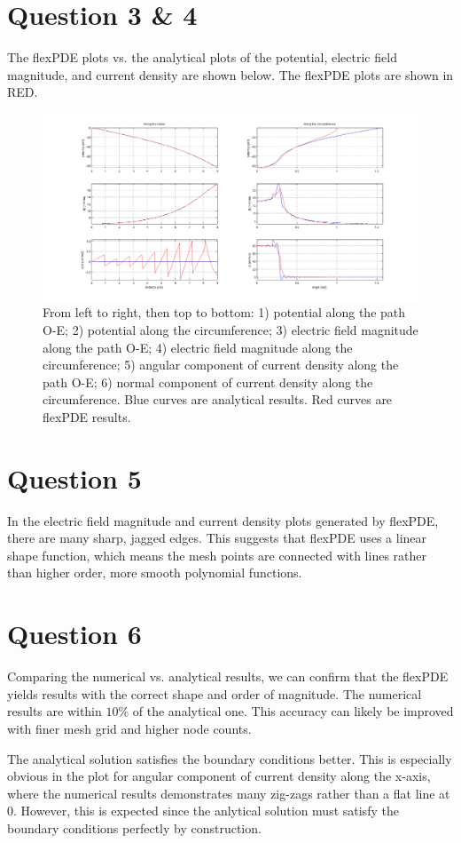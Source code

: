 \documentclass{article}
\begin{document}
\section{Question 3 \& 4}
The flexPDE plots vs. the analytical plots of the potential, electric field magnitude, and current density are shown below. The flexPDE plots are shown in RED.

\begin{figure}[H]
    \begin{center}
        \includegraphics[scale=0.35]{results.png}
        \caption{From left to right, then top to bottom: 1) potential along the path O-E; 2) potential along the circumference; 3) electric field magnitude along the path O-E; 4) electric field magnitude along the circumference; 5) angular component of current density along the path O-E; 6) normal component of current density along the circumference. Blue curves are analytical results. Red curves are flexPDE results.}
    \end{center}
\end{figure}

\section{Question 5}
In the electric field magnitude and current density plots generated by flexPDE, there are many sharp, jagged edges. This suggests that flexPDE uses a linear shape function, which means the mesh points are connected with lines rather than higher order, more smooth polynomial functions.

\section{Question 6}
Comparing the numerical vs. analytical results, we can confirm that the flexPDE yields results with the correct shape and order of magnitude. The numerical results are within $10\%$ of the analytical one. This accuracy can likely be improved with finer mesh grid and higher node counts.

The analytical solution satisfies the boundary conditions better. This is especially obvious in the plot for angular component of current density along the x-axis, where the numerical results demonstrates many zig-zags rather than a flat line at 0. However, this is expected since the anlytical solution must satisfy the boundary conditions perfectly by construction.
\end{document}

